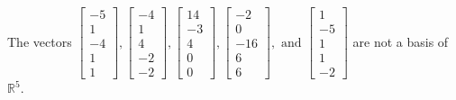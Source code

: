 \begin{exercise}
\begin{exerciseStatement}
  \end{exerciseStatement}
  \begin{exerciseAnswer}
   The vectors \(\left[\begin{array}{r}
-5 \\
1 \\
-4 \\
1 \\
1
\end{array}\right] , \left[\begin{array}{r}
-4 \\
1 \\
4 \\
-2 \\
-2
\end{array}\right] , \left[\begin{array}{r}
14 \\
-3 \\
4 \\
0 \\
0
\end{array}\right] , \left[\begin{array}{r}
-2 \\
0 \\
-16 \\
6 \\
6
\end{array}\right] , \text{ and } \left[\begin{array}{r}
1 \\
-5 \\
1 \\
1 \\
-2
\end{array}\right]\) 
  	 are not  a basis of \(\mathbb{R}^5\).
  


  \end{exerciseAnswer}
\end{exercise}